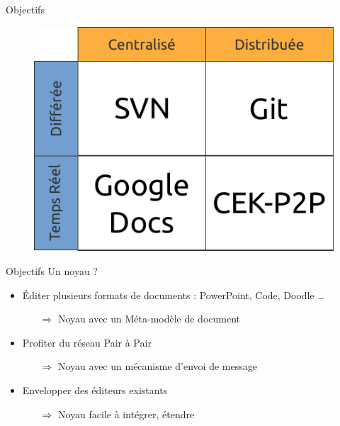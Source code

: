 \begin{frame}{Objectifs}
  \begin{figure}
    \center
    \includegraphics[width=.7\textwidth]{includes/tab2.pdf}
  \end{figure}
\end{frame}

\begin{frame}{Objectifs}
Un noyau ?
\begin{itemize}
  \item Éditer plusieurs formats de documents : PowerPoint, Code, Doodle \ldots 
    \begin{itemize}
    \item[$\Rightarrow$] Noyau avec un Méta-modèle de document
    \end{itemize}
  \item Profiter du réseau Pair à Pair
    \begin{itemize}
    \item[$\Rightarrow$] Noyau avec un mécanisme d'envoi de message
    \end{itemize}
  \item Envelopper des éditeurs existants
    \begin{itemize}
    \item[$\Rightarrow$] Noyau facile à intégrer, étendre
    \end{itemize}
\end{itemize}
\end{frame}

